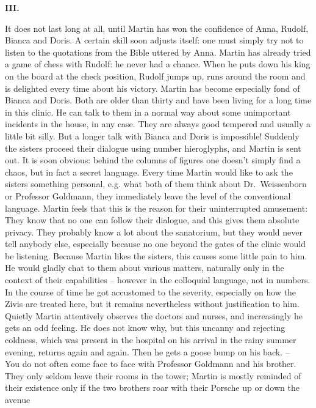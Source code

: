 \begin {center} 
{\bf III.} 
\end {center}
It does not last long at all, until Martin has won the confidence of Anna, Rudolf, 
Bianca and Doris. 
A certain skill soon adjusts itself: one must simply try not to listen to the 
quotations from the Bible uttered by Anna. 
Martin has already tried a game of chess with Rudolf: he never had a chance.
When he puts down his king on the board at the check position, Rudolf jumps up, 
runs around the room and is delighted every time about his victory. 
Martin has become especially fond of Bianca and Doris.
Both are older than thirty and have been living for a long time in this clinic. 
He can talk to them in a normal way about some unimportant incidents in the house, 
in any case. 
They are always good tempered and usually a little bit silly. 
But a longer talk with Bianca and Doris is impossible! 
Suddenly the sisters proceed their dialogue using number hieroglyphs, and Martin is 
sent out. 
It is soon obvious: behind the columns of figures one doesn't simply find a chaos, 
but in fact a secret language.
Every time Martin would like to ask the sisters something personal, e.g. what both 
of them think about Dr.~Weissenborn or Professor Goldmann, they immediately leave 
the level of the conventional language. 
Martin feels that this is the reason for their uninterrupted amusement: They know 
that no one can follow their dialogue, and this gives them absolute privacy. 
They probably know a lot about the sanatorium, but they would never tell anybody 
else, especially because no one beyond the gates of the clinic would be listening. 
Because Martin likes the sisters, this causes some little pain to him. 
He would gladly chat to them about various matters, naturally only in the context of 
their capabilities -- however in the colloquial language, not in numbers.
In the course of time he got accustomed to the severity, especially on how the Zivis 
are treated here, but it remains nevertheless without justification to him. 
Quietly Martin attentively observes the doctors and nurses, and increasingly he 
gets an odd feeling. 
He does not know why, but this uncanny and rejecting coldness, which was present in 
the hospital on his arrival in the rainy summer evening, returns again and again. 
Then he gets a goose bump on his back. -- \\
You do not often come face to face with Professor Goldmann and his brother. 
They only seldom leave their rooms in the tower; Martin is mostly reminded of their 
existence only if the two brothers roar with their Porsche up or down the avenue 
